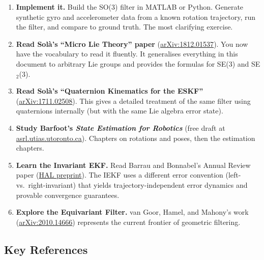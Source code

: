 \documentclass[11pt,letterpaper]{article}
\begin{document}
\begin{enumerate}
  \item \textbf{Implement it.}  Build the SO(3) filter in
    MATLAB or Python.  Generate synthetic gyro and accelerometer
    data from a known rotation trajectory, run the filter, and
    compare to ground truth.  The most clarifying exercise.

  \item \textbf{Read Sol\`{a}'s ``Micro Lie Theory'' paper}
    (\href{https://arxiv.org/abs/1812.01537}{arXiv:1812.01537}).
    You now have the vocabulary to read it fluently.  It generalises
    everything in this document to arbitrary Lie groups and provides
    the formulas for SE(3) and SE$_{2}$(3).

  \item \textbf{Read Sol\`{a}'s ``Quaternion Kinematics for the
    ESKF''}
    (\href{https://arxiv.org/abs/1711.02508}{arXiv:1711.02508}).
    This gives a detailed treatment of the same filter using
    quaternions internally (but with the same Lie algebra error
    state).

  \item \textbf{Study Barfoot's \emph{State Estimation for
    Robotics}} (free draft at
    \href{http://asrl.utias.utoronto.ca/~tdb/bib/barfoot_ser24.pdf}%
    {asrl.utias.utoronto.ca}).  Chapters on rotations and poses,
    then the estimation chapters.

  \item \textbf{Learn the Invariant EKF.}  Read Barrau and
    Bonnabel's Annual Review paper
    (\href{https://hal.science/hal-05088150v1/file/AR_barrau_bonnabel.pdf}%
    {HAL preprint}).  The IEKF uses a different error
    convention (left- vs.\ right-invariant) that yields
    trajectory-independent error dynamics and provable convergence
    guarantees.

  \item \textbf{Explore the Equivariant Filter.}  van Goor, Hamel,
    and Mahony's work
    (\href{https://arxiv.org/abs/2010.14666}{arXiv:2010.14666})
    represents the current frontier of geometric filtering.
\end{enumerate}

\subsection*{Key References}
\end{document}
